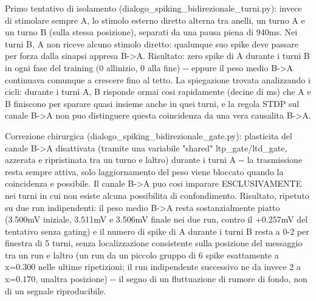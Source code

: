\documentclass[
  italian,
]{article}
\begin{document}
Primo tentativo di isolamento (dialogo\_\allowbreak{}spiking\_\allowbreak{}bidirezionale\_\allowbreak{}turni.py): invece di stimolare sempre A, lo stimolo esterno diretto alterna tra anelli, un turno \textquotesingle A\textquotesingle{} e un turno \textquotesingle B\textquotesingle{} (sulla stessa posizione), separati da una pausa piena di 940ms. Nei turni \textquotesingle B\textquotesingle, A non riceve alcuno stimolo diretto: qualunque suo spike deve passare per forza dalla sinapsi appresa B-\textgreater A. Risultato: zero spike di A durante i turni \textquotesingle B\textquotesingle{} in ogni fase del training (0 all\textquotesingle inizio, 0 alla fine) -\/- eppure il peso medio B-\textgreater A continuava comunque a crescere fino al tetto. La spiegazione trovata analizzando i cicli: durante i turni \textquotesingle A\textquotesingle, B risponde ormai cosi\textquotesingle{} rapidamente (decine di ms) che A e B finiscono per sparare quasi insieme anche in quei turni, e la regola STDP sul canale B-\textgreater A non puo\textquotesingle{} distinguere questa coincidenza da una vera causalita\textquotesingle{} B-\textgreater A.

Correzione chirurgica (dialogo\_\allowbreak{}spiking\_\allowbreak{}bidirezionale\_\allowbreak{}gate.py): plasticita\textquotesingle{} del canale B-\textgreater A disattivata (tramite una variabile "shared" ltp\_\allowbreak{}gate/ltd\_\allowbreak{}gate, azzerata e ripristinata tra un turno e l\textquotesingle altro) durante i turni \textquotesingle A\textquotesingle{} -\/- la trasmissione resta sempre attiva, solo l\textquotesingle aggiornamento del peso viene bloccato quando la coincidenza e\textquotesingle{} possibile. Il canale B-\textgreater A puo\textquotesingle{} cosi\textquotesingle{} imparare ESCLUSIVAMENTE nei turni in cui non esiste alcuna possibilita\textquotesingle{} di confondimento. Risultato, ripetuto su due run indipendenti: il peso medio B-\textgreater A resta sostanzialmente piatto (3.500mV iniziale, 3.511mV e 3.506mV finale nei due run, contro il +0.257mV del tentativo senza gating) e il numero di spike di A durante i turni \textquotesingle B\textquotesingle{} resta a 0-2 per finestra di 5 turni, senza localizzazione consistente sulla posizione del messaggio tra un run e l\textquotesingle altro (un run da\textquotesingle{} un piccolo gruppo di 6 spike esattamente a x=0.300 nelle ultime ripetizioni; il run indipendente successivo ne da\textquotesingle{} invece 2 a x=0.170, un\textquotesingle altra posizione) -\/- il segno di un fluttuazione di rumore di fondo, non di un segnale riproducibile.
\end{document}
